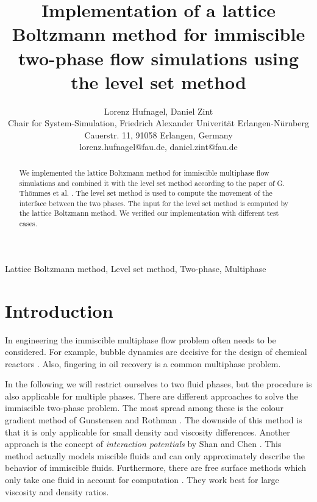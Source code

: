 \documentclass[final,leqno,onefignum,onetabnum]{siamltexmm}
\title{Implementation of a lattice Boltzmann method for immiscible two-phase flow simulations using the level set method}
\author
{Lorenz Hufnagel, Daniel Zint\\
Chair for System-Simulation, Friedrich Alexander Univerit\"at Erlangen-N\"urnberg\\
Cauerstr. 11, 91058 Erlangen, Germany\\
lorenz.hufnagel@fau.de, daniel.zint@fau.de %
}
\begin{document}
\maketitle
\newcommand{\slugmaster}{%
\slugger{}{}{}{}{}}%

\begin{abstract}
	We implemented the lattice Boltzmann method for immiscible multiphase flow simulations and combined it with the level set method according to the paper of G. Th\"ommes et al. \cite{Thoemmes}. The level set method is used to compute the movement of the interface between the two phases. The input for the level set method is computed by the lattice Boltzmann method. We verified our implementation with different test cases.
\end{abstract}

\begin{keywords}
	Lattice Boltzmann method,
	Level set method,
	Two-phase,
	Multiphase
\end{keywords}



\pagestyle{myheadings}
\thispagestyle{plain}

\section{Introduction}
In engineering the immiscible multiphase flow problem often needs to be considered. For example, bubble dynamics are decisive for the design of chemical reactors \cite{trygg}. Also, fingering in oil recovery is a common multiphase problem.

In the following we will restrict ourselves to two fluid phases, but the procedure is also applicable for multiple phases. 
There are different approaches to solve the immiscible two-phase problem. The most spread among these is the colour gradient method of Gunstensen and Rothman \cite{GRcg1,GRcg2,GRcg3}. The downside of this method is that it is only applicable for small density and viscosity differences. Another approach is the concept of {\it interaction potentials} by Shan and Chen \cite{ShanChen1,ShanChen2}. This method actually models miscible fluids and can only approximately describe the behavior of immiscible fluids. Furthermore, there are free surface methods which only take one fluid in account for computation \cite{Koerner,Scardovelli,Hirt}. They work best for large viscosity and density ratios.
\end{document}
